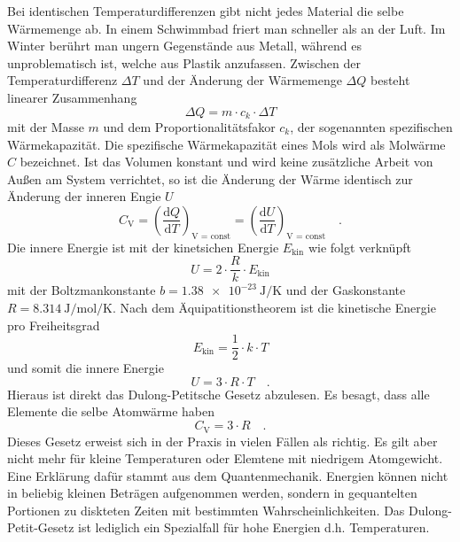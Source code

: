 Bei identischen Temperaturdifferenzen gibt nicht jedes Material die selbe Wärmemenge ab. In einem Schwimmbad friert man schneller als an der Luft. Im Winter berührt man ungern Gegenstände aus Metall, während es unproblematisch ist, welche aus Plastik anzufassen.
Zwischen der Temperaturdifferenz $\Delta T$ und der Änderung der Wärmemenge $\Delta Q$ besteht linearer Zusammenhang
\begin{equation}
  \Delta Q = m \cdot c_k \cdot \Delta T
\end{equation}
mit der Masse $m$ und dem Proportionalitätsfakor $c_k$, der sogenannten spezifischen Wärmekapazität.
Die spezifische Wärmekapazität eines Mols wird als Molwärme $C$ bezeichnet. Ist das Volumen konstant und wird keine zusätzliche Arbeit von Außen am System verrichtet, so ist die Änderung der Wärme identisch zur Änderung der inneren Engie $U$
\begin{equation}
  C_\text{V} = \left(\frac{\text{d} Q}{\text{d} T} \right)_\text{V = const}= \left(\frac{\text{d} U}{\text{d} T} \right)_\text{V = const} \quad.
\end{equation}
Die innere Energie ist mit der kinetsichen Energie $E_\text{kin}$ wie folgt verknüpft
\begin{equation}
  U = 2 \cdot \frac{R}{k} \cdot E_\text{kin}
\end{equation}
mit der Boltzmankonstante $b = \SI{1.38e-23}{\joule\per\kelvin}$ und der Gaskonstante $R = \SI{8.314}{\joule\per\mol\per\kelvin}$.
Nach dem Äquipatitionstheorem ist die kinetische Energie pro Freiheitsgrad
\begin{equation}
E_\text{kin}=\frac{1}{2}\cdot k \cdot T
\end{equation}
und somit die innere Energie
\begin{equation}
U = 3 \cdot R \cdot T \quad.
\end{equation}
Hieraus ist direkt das Dulong-Petitsche Gesetz abzulesen. Es besagt, dass alle Elemente die selbe Atomwärme haben
\begin{equation}\label{Dulong-Petit}
  C_\text{V} = 3 \cdot R \quad.
\end{equation}
Dieses Gesetz erweist sich in der Praxis in vielen Fällen als richtig. Es gilt aber nicht mehr für kleine Temperaturen oder Elemtene mit niedrigem Atomgewicht. Eine Erklärung dafür stammt aus dem Quantenmechanik. Energien können nicht in beliebig kleinen Beträgen aufgenommen werden, sondern in gequantelten Portionen zu diskteten Zeiten mit bestimmten Wahrscheinlichkeiten. Das Dulong-Petit-Gesetz ist lediglich ein Spezialfall für hohe Energien d.h. Temperaturen. \\
